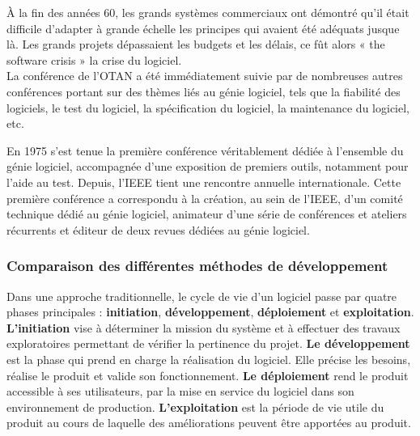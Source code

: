 À la fin des années 60, les grands systèmes commerciaux ont démontré qu'il était difficile d'adapter à grande échelle les principes qui avaient été adéquats jusque là. Les grands projets dépassaient les budgets et les délais, ce fût alors « the software crisis » la crise du logiciel\cite{origine_gl2}.\\

La conférence de l'OTAN a été immédiatement suivie par de nombreuses autres conférences portant sur des thèmes liés au génie logiciel, tels que la fiabilité des logiciels, le test du logiciel, la spécification du logiciel, la maintenance du logiciel, etc.

En 1975 s'est tenue la première conférence véritablement dédiée à l’ensemble du génie logiciel, accompagnée d'une exposition de premiers outils, notamment pour l’aide au test. Depuis, l’IEEE tient une rencontre annuelle internationale. Cette première conférence a correspondu à la création, au sein de l’IEEE, d’un comité technique dédié au génie logiciel, animateur d’une série de conférences et ateliers récurrents et éditeur de deux revues dédiées au génie logiciel\cite{origine_gl3}.
\subsubsection{Comparaison des différentes méthodes de développement}
Dans une approche traditionnelle, le cycle de vie d'un logiciel passe par quatre phases principales : \textbf{initiation}, \textbf{développement}, \textbf{déploiement} et \textbf{exploitation}.\\
\textbf{L'initiation} vise à déterminer la mission du système et à effectuer des travaux exploratoires permettant de vérifier la pertinence du projet. \textbf{Le développement} est la phase qui prend en charge la réalisation du logiciel. Elle précise les besoins, réalise le produit et valide son fonctionnement. \textbf{Le déploiement} rend le produit accessible à ses utilisateurs, par la mise en service du logiciel dans son environnement de production. \textbf{L’exploitation} est la période de vie utile du produit au cours de laquelle des améliorations peuvent être apportées au produit. 

